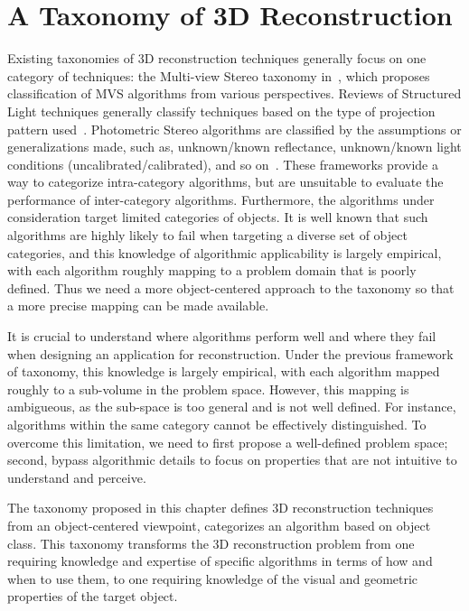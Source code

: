 
\chapter{A Taxonomy of 3D Reconstruction}
\label{ch:3DRecon_Taxo}
Existing taxonomies of 3D reconstruction techniques generally focus on one category of techniques: the Multi-view Stereo taxonomy in~\cite{seitz2006comparison}, which proposes classification of MVS algorithms from various perspectives. Reviews of Structured Light techniques generally classify techniques based on the type of projection pattern used~\cite{geng2011structured, salvi2004pattern}. Photometric Stereo algorithms are classified by the assumptions or generalizations made, such as, unknown/known reflectance, unknown/known light conditions (uncalibrated/calibrated), and so on~\cite{shi2016benchmark}. These frameworks provide a way to categorize intra-category algorithms, but are unsuitable to evaluate the performance of inter-category algorithms. Furthermore, the algorithms under consideration target limited categories of objects. It is well known that such algorithms are highly likely to fail when targeting a diverse set of object categories, and this knowledge of algorithmic applicability is largely empirical, with each algorithm roughly mapping to a problem domain that is poorly defined. Thus we need a more object-centered approach to the taxonomy so that a more precise mapping can be made available.

It is crucial to understand where algorithms perform well and where they fail when designing an application for reconstruction. Under the previous framework of taxonomy, this knowledge is largely empirical, with each algorithm mapped roughly to a sub-volume in the problem space. However, this mapping is ambigueous, as the sub-space is too general and is not well defined. For instance, algorithms within the same category cannot be effectively distinguished. To overcome this limitation, we need to first propose a well-defined problem space; second, bypass algorithmic details to focus on properties that are not intuitive to understand and perceive.

The taxonomy proposed in this chapter defines 3D reconstruction techniques from an object-centered viewpoint, \ie categorizes an algorithm based on object class. This taxonomy transforms the 3D reconstruction problem from one requiring knowledge and expertise of specific algorithms in terms of how and when to use them, to one requiring knowledge of the visual and geometric properties of the target object.

